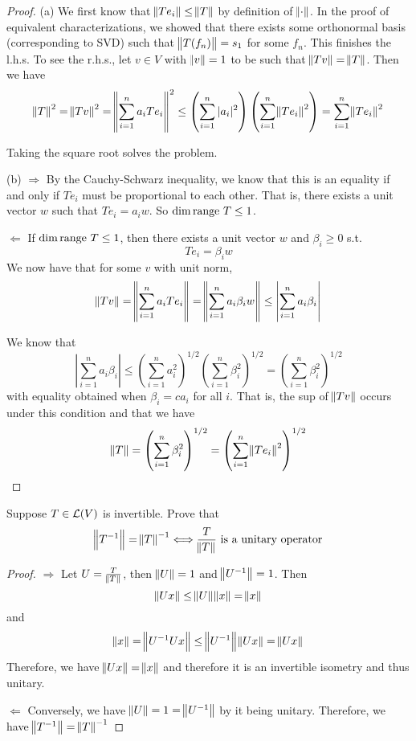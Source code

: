 \documentclass{extarticle}
\begin{document}
\begin{proof}
(a) We first know that \(\norm{T e_i} \leq \norm{T}\) by definition of \(\norm{\cdot}\). In the proof 
of equivalent characterizations, we showed that there exists some orthonormal basis (corresponding to SVD)
such that \(\norm{T(f_n)} = s_1\) for some \(f_n\). This finishes the l.h.s. To see the r.h.s., 
let \(v \in V\) with \(\norm{v} = 1\) to be such that \(\norm{Tv} = \norm{T}\). Then we have 
\begin{align*}
    \norm{T}^2 = \norm{Tv}^2 = \norm{ \sum_{i=1}^{n} a_i  Te_i}^2
    \leq \left(\sum_{i=1}^{n} |a_i|^2 \right) \left(\sum_{i=1}^{n} \norm{Te_i}^2 \right) 
    = \sum_{i=1}^{n} \norm{Te_i}^2
\end{align*}

Taking the square root solves the problem. 

(b) \(\Rightarrow\) By the Cauchy-Schwarz inequality, we know that this is an equality if and only if 
\(Te_i\) must be proportional to each other. That is, there exists 
a unit vector \(w\) such that \(Te_i = a_i w\). So \(\dim \text{range } T \leq 1\). 

\(\Leftarrow\) If \(\dim \text{range } T \leq 1\), then there exists a unit vector \(w\) and 
\(\beta_i \geq 0\) s.t. 
\[Te_i = \beta_i w\]
We now have that for some \(v\) with unit norm, 
\[\norm{Tv} = \norm{\sum_{i=1}^{n} a_i T e_i} = 
\norm{\sum_{i=1}^{n}a_i \beta_i w} \leq \left|\sum_{i=1}^{n} a_i \beta_i \right|\]

We know that 
\[\left|\sum_{i=1}^{n} a_i \beta_i \right| \leq \left(\sum_{i=1}^{n} a_i^2 \right)^{1/2} \left(\sum_{i=1}^{n} \beta_i^2 \right)^{1/2} 
= \left(\sum_{i=1}^{n} \beta_i^2 \right)^{1/2}\]
with equality obtained when \(\beta_i = c a_i\) for all \(i\). That is, the sup of \(\norm{Tv}\) 
occurs under this condition and that we have 
\[\norm{T} = \left(\sum_{i=1}^{n} \beta_i^2 \right)^{1/2} = \left(\sum_{i=1}^{n} \norm{Te_i}^2 \right)^{1/2}\]
\end{proof}

\begin{problem}{24}
    Suppose \(T \in \mathcal{L}(V)\) is invertible. Prove that 
    \[\norm{T^{-1}} = \norm{T}^{-1} \Longleftrightarrow \frac{T}{\norm{T}} \text{ is a unitary operator}\]
\end{problem}

\begin{proof}
\(\Rightarrow\) Let \(U = \frac{T}{\norm{T}}\), then \(\norm{U} = 1\) and \(\norm{U^{-1}} = 1\). Then 
\[\norm{Ux} \leq \norm{U}\norm{x} = \norm{x}\]
and 
\[\norm{x} = \norm{U^{-1}Ux} \leq \norm{U^{-1}}\norm{Ux} = \norm{Ux}\]
Therefore, we have \(\norm{Ux} = \norm{x}\) and therefore it is an invertible isometry and thus unitary. 

\(\Leftarrow\) Conversely, we have \(\norm{U} = 1 = \norm{U^{-1}}\) by it being unitary. Therefore, we have 
\(\norm{T^{-1}} = \norm{T}^{-1}\)
\end{proof}
\end{document}
